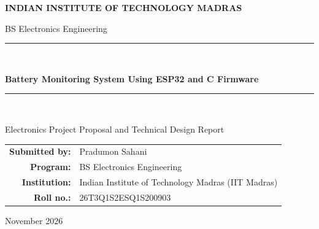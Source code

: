 \documentclass[12pt,a4paper]{article}
\begin{document}
\begin{titlepage}
    \centering
    \vspace*{0.8cm}

    {\Large \textbf{INDIAN INSTITUTE OF TECHNOLOGY MADRAS}\par}
    \vspace{0.3cm}
    {\large BS Electronics Engineering\par}
    \vspace{1.2cm}

    \rule{\linewidth}{0.5mm}\\[0.5cm]
    {\LARGE \bfseries Battery Monitoring System Using ESP32 and C Firmware\par}
    \vspace{0.4cm}
    \rule{\linewidth}{0.5mm}\\[1.0cm]

    {\large Electronics Project Proposal and Technical Design Report\par}
    \vspace{1.6cm}

    \begin{tabular}{rl}
        \textbf{Submitted by:} & Pradumon Sahani \\
        \textbf{Program:} & BS Electronics Engineering \\
        \textbf{Institution:} & Indian Institute of Technology Madras (IIT Madras) \\
        \textbf{Roll no.:} & 26T3Q1S2ESQ1S200903 \\
    \end{tabular}

    \vfill

    {\large November 2026\par}
\end{titlepage}

\end{document}
